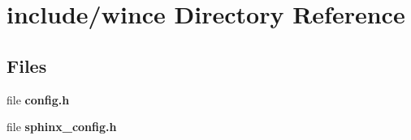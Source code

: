 \section{include/wince Directory Reference}
\label{dir_62c6e5a1b0f237231e4a7e8e8a0f0425}
\subsection*{Files}
\begin{DoxyCompactItemize}
\item 
file {\bfseries config.\-h}
\item 
file {\bfseries sphinx\-\_\-config.\-h}
\end{DoxyCompactItemize}
